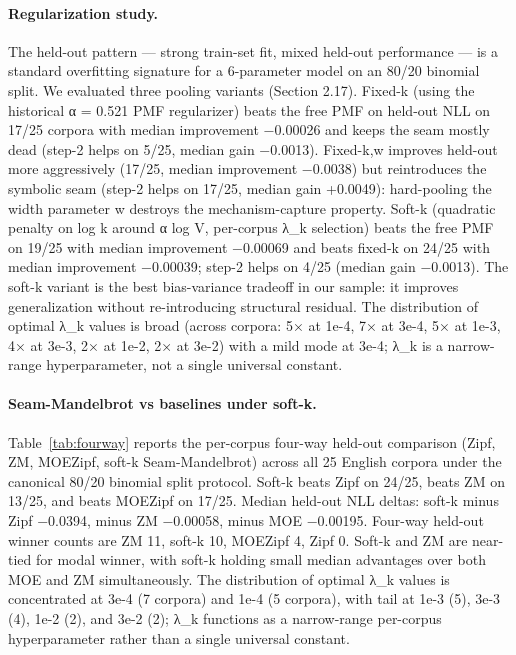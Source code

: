 \documentclass[11pt]{article}
\begin{document}
\paragraph{Regularization study.} The held-out pattern — strong train-set fit, mixed held-out performance — is a standard overfitting signature for a 6-parameter model on an 80/20 binomial split. We evaluated three pooling variants (Section 2.17). Fixed-k (using the historical α = 0.521 PMF regularizer) beats the free PMF on held-out NLL on 17/25 corpora with median improvement −0.00026 and keeps the seam mostly dead (step-2 helps on 5/25, median gain −0.0013). Fixed-k,w improves held-out more aggressively (17/25, median improvement −0.0038) but reintroduces the symbolic seam (step-2 helps on 17/25, median gain +0.0049): hard-pooling the width parameter w destroys the mechanism-capture property. Soft-k (quadratic penalty on log k around α log V, per-corpus λ\_k selection) beats the free PMF on 19/25 with median improvement −0.00069 and beats fixed-k on 24/25 with median improvement −0.00039; step-2 helps on 4/25 (median gain −0.0013). The soft-k variant is the best bias-variance tradeoff in our sample: it improves generalization without re-introducing structural residual. The distribution of optimal λ\_k values is broad (across corpora: 5× at 1e-4, 7× at 3e-4, 5× at 1e-3, 4× at 3e-3, 2× at 1e-2, 2× at 3e-2) with a mild mode at 3e-4; λ\_k is a narrow-range hyperparameter, not a single universal constant.

\paragraph{Seam-Mandelbrot vs baselines under soft-k.} Table~\ref{tab:fourway} reports the per-corpus four-way held-out comparison (Zipf, ZM, MOEZipf, soft-k Seam-Mandelbrot) across all 25 English corpora under the canonical 80/20 binomial split protocol. Soft-k beats Zipf on 24/25, beats ZM on 13/25, and beats MOEZipf on 17/25. Median held-out NLL deltas: soft-k minus Zipf −0.0394, minus ZM −0.00058, minus MOE −0.00195. Four-way held-out winner counts are ZM 11, soft-k 10, MOEZipf 4, Zipf 0. Soft-k and ZM are near-tied for modal winner, with soft-k holding small median advantages over both MOE and ZM simultaneously. The distribution of optimal λ\_k values is concentrated at 3e-4 (7 corpora) and 1e-4 (5 corpora), with tail at 1e-3 (5), 3e-3 (4), 1e-2 (2), and 3e-2 (2); λ\_k functions as a narrow-range per-corpus hyperparameter rather than a single universal constant.
\end{document}
